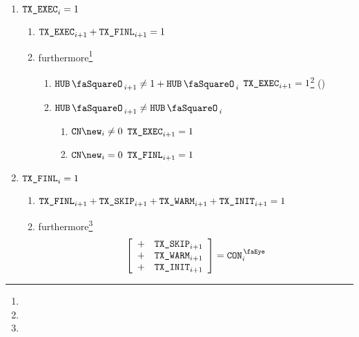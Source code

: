 \begin{enumerate}
        \item \If $\texttt{TX}\texttt{\_EXEC} _{i} = 1$ \Then
                \begin{enumerate}
                        \item $\texttt{TX}\texttt{\_EXEC} _{i + 1} + \texttt{TX}\texttt{\_FINL} _{i + 1} = 1$
                        \item furthermore\footnote{}
                                \begin{enumerate}
                                        \item \If $\hubStamp _{i + 1} \neq 1 + \hubStamp _{i}$ \Then $\texttt{TX}\texttt{\_EXEC} _{i + 1} = 1$\footnote{} \quad (\sanityCheck)
                                        \item \If $\hubStamp _{i + 1} \neq     \hubStamp _{i}$ \Then
                                                \begin{enumerate}
                                                        \item \If $\cn\new _{i} \neq 0$ \Then $\texttt{TX}\texttt{\_EXEC} _{i + 1} = 1$
                                                        \item \If $\cn\new _{i} =    0$ \Then $\texttt{TX}\texttt{\_FINL} _{i + 1} = 1$
                                                \end{enumerate}
                                \end{enumerate}
                \end{enumerate}
        \item \If $\texttt{TX}\texttt{\_FINL} _{i} = 1$ \Then
                \begin{enumerate}
                        \item $\texttt{TX}\texttt{\_FINL} _{i + 1} + \texttt{TX}\texttt{\_SKIP} _{i + 1} + \texttt{TX}\texttt{\_WARM} _{i + 1} + \texttt{TX}\texttt{\_INIT} _{i + 1} = 1$
                        \item furthermore\footnote{}
                                \[
                                        \left[ \begin{array}{lcl}
                                                + & \txSkip _{i + 1} \\
                                                + & \txWarm _{i + 1} \\
                                                + & \txInit _{i + 1} \\
                                        \end{array} \right]
                                        = \peekContext _{i}
                                \]
                \end{enumerate}
\end{enumerate}

